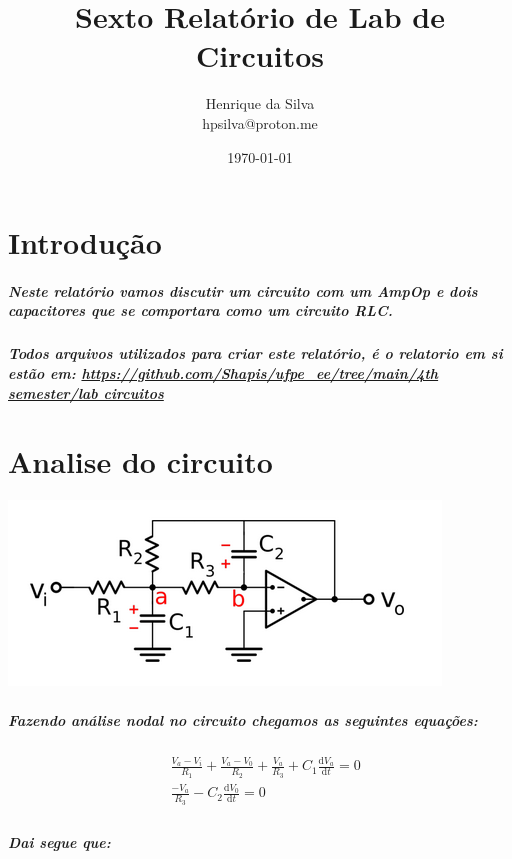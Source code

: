 \documentclass[12pt,twoside, a4paper, twocolumn]{article}
\title{Sexto Relatório de Lab de Circuitos}
\author{Henrique da Silva \\ hpsilva@proton.me}
\date{\today}
\newcommand\deriv[2]{\frac{\mathrm d #1}{\mathrm d #2}}
\begin{document}
\maketitle
{}
\newpage
\tableofcontents
\newpage



\section{Introdução}

\subparagraph*{Neste relatório vamos discutir um circuito com um AmpOp e dois capacitores que se comportara como um circuito RLC.}

\subparagraph*{Todos arquivos utilizados para criar este relatório, é o relatorio em si estão em:  \url{https://github.com/Shapis/ufpe_ee/tree/main/4th semester/lab circuitos}}


\section{Analise do circuito}

\begin{adjustbox}{scale=0.6}
    \includegraphics{Figure_2.png}
\end{adjustbox}

\subparagraph*{Fazendo análise nodal no circuito chegamos as seguintes equações:}

\begin{equation}
    \begin{aligned}
         & \frac{V_a - V_i}{R_1} + \frac{V_a - V_0}{R_2} + \frac{V_a}{R_3} + C_1 \deriv{V_a}{t} = 0 \\
         & \frac{-V_a}{R_3} - C_2 \deriv{V_0}{t} = 0                                                \\
    \end{aligned}
\end{equation}

\subparagraph*{Dai segue que:}
\end{document}
